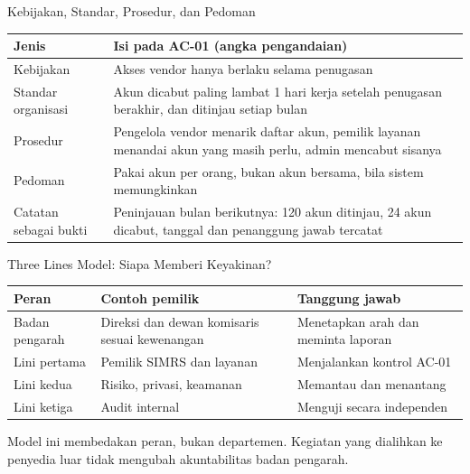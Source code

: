 \documentclass[aspectratio=169, table, 12pt]{beamer}
\begin{document}
\begin{frame}{{\Large Kebijakan, Standar, Prosedur, dan Pedoman}}
  \vspace{2pt}
  \footnotesize
  \begin{tabularx}{\textwidth}{|>{\raggedright\arraybackslash}p{}|>{\raggedright\arraybackslash}X|}
    \hline
    \textbf{Jenis} & \textbf{Isi pada AC-01 (angka pengandaian)} \\ \hline
    Kebijakan & Akses vendor hanya berlaku selama penugasan \\ \hline
    Standar organisasi & Akun dicabut paling lambat 1 hari kerja setelah penugasan berakhir,
    dan ditinjau setiap bulan \\ \hline
    Prosedur & Pengelola vendor menarik daftar akun, pemilik layanan menandai akun yang masih
    perlu, admin mencabut sisanya \\ \hline
    Pedoman & Pakai akun per orang, bukan akun bersama, bila sistem memungkinkan \\ \hline
    Catatan sebagai bukti & Peninjauan bulan berikutnya: 120 akun ditinjau, 24 akun dicabut,
    tanggal dan penanggung jawab tercatat \\ \hline
  \end{tabularx}
\end{frame}

\begin{frame}{{\Large Three Lines Model: Siapa Memberi Keyakinan?}}
  \vspace{2pt}
  \footnotesize
  \begin{tabularx}{\textwidth}{|>{\raggedright\arraybackslash}p{}|>{\raggedright\arraybackslash}X|>{\raggedright\arraybackslash}X|}
    \hline
    \textbf{Peran} & \textbf{Contoh pemilik} & \textbf{Tanggung jawab} \\ \hline
    Badan pengarah & Direksi dan dewan komisaris sesuai kewenangan & Menetapkan arah dan meminta
    laporan \\ \hline
    Lini pertama & Pemilik SIMRS dan layanan & Menjalankan kontrol AC-01 \\ \hline
    Lini kedua & Risiko, privasi, keamanan & Memantau dan menantang \\ \hline
    Lini ketiga & Audit internal & Menguji secara independen \\ \hline
  \end{tabularx}

  \vspace{8pt}
  \small Model ini membedakan peran, bukan departemen. Kegiatan yang dialihkan ke penyedia luar
  tidak mengubah akuntabilitas badan pengarah.
\end{frame}
\end{document}
